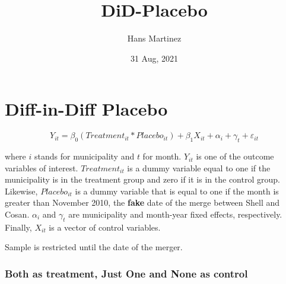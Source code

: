 \documentclass[
]{article}
\title{DiD-Placebo}
\author{Hans Martinez}
\date{31 Aug, 2021}
\begin{document}
\maketitle

\hypertarget{diff-in-diff-placebo}{%
\section{Diff-in-Diff Placebo}\label{diff-in-diff-placebo}}

\begin{equation}
  Y_{it}=\beta_{0}(Treatment_{it}*Placebo_{it}) + \beta_1 X_{it} + \alpha_{i} + \gamma_{t}  + \varepsilon_{it}
\end{equation}

where \(i\) stands for municipality and \(t\) for month. \(Y_{it}\) is
one of the outcome variables of interest. \(Treatment_{it}\) is a dummy
variable equal to one if the municipality is in the treatment group and
zero if it is in the control group. Likewise, \(Placebo_{it}\) is a
dummy variable that is equal to one if the month is greater than
November 2010, the \textbf{fake} date of the merge between Shell and
Cosan. \(\alpha_i\) and \(\gamma_t\) are municipality and month-year
fixed effects, respectively. Finally, \(X_{it}\) is a vector of control
variables.

Sample is restricted until the date of the merger.

\hypertarget{both-as-treatment-just-one-and-none-as-control}{%
\subsubsection{Both as treatment, Just One and None as
control}\label{both-as-treatment-just-one-and-none-as-control}}
\end{document}

